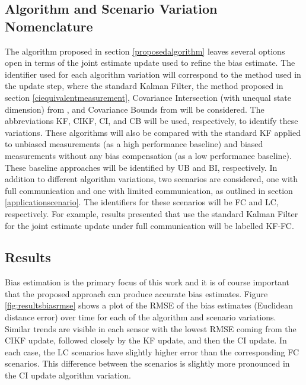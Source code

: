\documentclass[journal]{IEEEtran}
\begin{document}
\subsection{Algorithm and Scenario Variation Nomenclature}
The algorithm proposed in section \ref{proposedalgorithm} leaves several options open in terms of the joint estimate update used to refine the bias estimate. The identifier used for each algorithm variation will correspond to the method used in the update step, where the standard Kalman Filter, the method proposed in section \ref{ciequivalentmeasurement}, Covariance Intersection (with unequal state dimension) from \cite{uhlmann1995dynamic}, and Covariance Bounds from \cite{noack2014fusion} will be considered. The abbreviations KF, CIKF, CI, and CB will be used, respectively, to identify these variations. These algorithms will also be compared with the standard KF applied to unbiased measurements (as a high performance baseline) and biased measurements without any bias compensation (as a low performance baseline). These baseline approaches will be identified by UB and BI, respectively. In addition to different algorithm variations, two scenarios are considered, one with full communication and one with limited communication, as outlined in section \ref{applicationscenario}. The identifiers for these scenarios will be FC and LC, respectively. For example, results presented that use the standard Kalman Filter for the joint estimate update under full communication will be labelled KF-FC.

\subsection{Results} \label{simulationresults}
Bias estimation is the primary focus of this work and it is of course important that the proposed approach can produce accurate bias estimates. Figure \ref{fig:resultsbiasrmse} shows a plot of the RMSE of the bias estimates (Euclidean distance error) over time for each of the algorithm and scenario variations. Similar trends are visible in each sensor with the lowest RMSE coming from the CIKF update, followed closely by the KF update, and then the CI update. In each case, the LC scenarios have slightly higher error than the corresponding FC scenarios. This difference between the scenarios is slightly more pronounced in the CI update algorithm variation.
\end{document}
